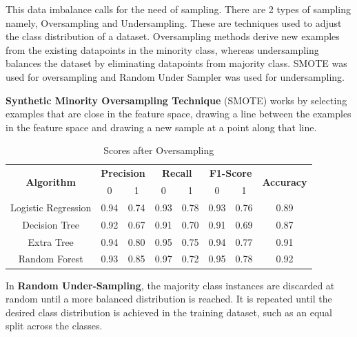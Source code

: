 \documentclass[12pt]{article}
\begin{document}
This data imbalance calls for the need of sampling.
There are 2 types of sampling namely, Oversampling and
Undersampling. These are techniques used to adjust the class distribution of a dataset. Oversampling methods derive new examples from the existing datapoints in the minority class, whereas undersampling balances the dataset by eliminating datapoints from majority class. SMOTE was used for oversampling and Random Under Sampler was used for undersampling.\\
\begin{center}
         \textbf{Synthetic Minority Oversampling Technique} (SMOTE) works by selecting examples that are close in the feature space, drawing a line between the examples in the feature space and drawing a new sample at a point along that line.\\
\end{center}
\begin{table}[H]
\begin{center}
\caption{Scores after Oversampling}
\begin{tabular}{ |c|c|c|c|c|c|c|c| }
\hline
 \multirow{2}{*}{\textbf{Algorithm}} & \multicolumn{2}{c|}{\textbf{Precision}} & \multicolumn{2}{c|}{\textbf{Recall}} & \multicolumn{2}{c|}{\textbf{F1-Score}} & \multirow{2}{*}{\textbf{Accuracy}} \\
 \cline{2-7}
        & 0 & 1 & 0 & 1 & 0 & 1 & \\
\hline
Logistic Regression & 0.94 & 0.74 & 0.93 & 0.78 & 0.93 & 0.76 &  0.89\\
 \hline
 Decision Tree & 0.92 & 0.67 & 0.91 & 0.70 & 0.91 & 0.69 & 0.87\\
 \hline
 Extra Tree & 0.94 & 0.80 & 0.95 & 0.75 & 0.94 & 0.77 & 0.91\\
 \hline
 Random Forest & 0.93 & 0.85 & 0.97 & 0.72 & 0.95 & 0.78 & 0.92\\
\hline
\end{tabular}
\label{Table 5}
\end{center}
\end{table}
     In \textbf{Random Under-Sampling}, the majority class instances are discarded at random until a more balanced distribution is reached. It is repeated until the desired class distribution is achieved in the training dataset, such as an equal split across the classes.
\end{document}
